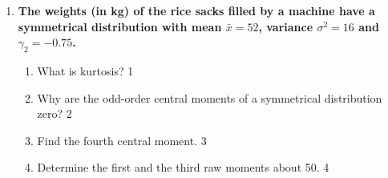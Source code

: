 \documentclass[a4paper,oneside]{book}
\begin{document}
\begin{enumerate}
\item
\textbf{The weights (in kg) of the rice sacks filled by a machine have a symmetrical distribution with mean $\bar x = 52$, variance $\sigma^2 = 16$ and $\gamma_2 = -0.75$.}

\begin{enumerate}
  \item What is kurtosis? \hfill 1
  \item Why are the odd-order central moments of a symmetrical distribution zero? \hfill 2
  \item Find the fourth central moment. \hfill 3
  \item Determine the first and the third raw moments about 50. \hfill 4
\end{enumerate}

\end{enumerate}
\end{document}
